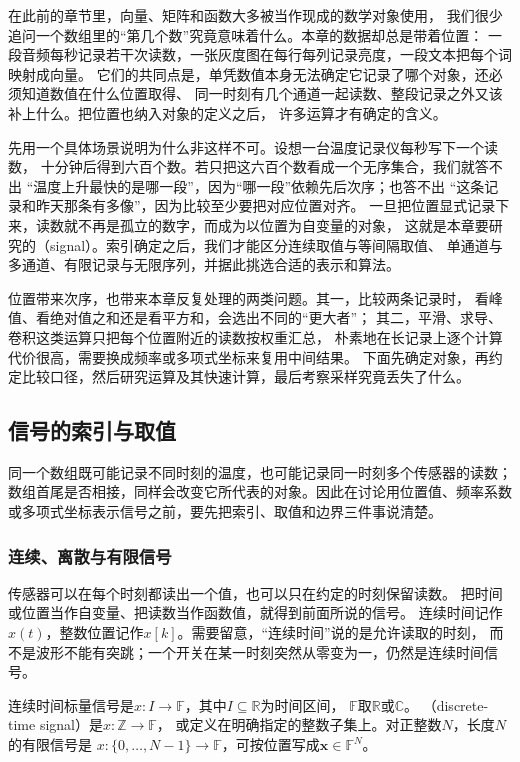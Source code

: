 在此前的章节里，向量、矩阵和函数大多被当作现成的数学对象使用，
我们很少追问一个数组里的“第几个数”究竟意味着什么。本章的数据却总是带着位置：
一段音频每秒记录若干次读数，一张灰度图在每行每列记录亮度，一段文本把每个词映射成向量。
它们的共同点是，单凭数值本身无法确定它记录了哪个对象，还必须知道数值在什么位置取得、
同一时刻有几个通道一起读数、整段记录之外又该补上什么。把位置也纳入对象的定义之后，
许多运算才有确定的含义。

先用一个具体场景说明为什么非这样不可。设想一台温度记录仪每秒写下一个读数，
十分钟后得到六百个数。若只把这六百个数看成一个无序集合，我们就答不出
“温度上升最快的是哪一段”，因为“哪一段”依赖先后次序；也答不出
“这条记录和昨天那条有多像”，因为比较至少要把对应位置对齐。
一旦把位置显式记录下来，读数就不再是孤立的数字，而成为以位置为自变量的对象，
这就是本章要研究的（signal）。索引确定之后，我们才能区分连续取值与等间隔取值、
单通道与多通道、有限记录与无限序列，并据此挑选合适的表示和算法。

位置带来次序，也带来本章反复处理的两类问题。其一，比较两条记录时，
看峰值、看绝对值之和还是看平方和，会选出不同的“更大者”；
其二，平滑、求导、卷积这类运算只把每个位置附近的读数按权重汇总，
朴素地在长记录上逐个计算代价很高，需要换成频率或多项式坐标来复用中间结果。
下面先确定对象，再约定比较口径，然后研究运算及其快速计算，最后考察采样究竟丢失了什么。

\subsection{信号的索引与取值}

同一个数组既可能记录不同时刻的温度，也可能记录同一时刻多个传感器的读数；
数组首尾是否相接，同样会改变它所代表的对象。因此在讨论用位置值、频率系数
或多项式坐标表示信号之前，要先把索引、取值和边界三件事说清楚。

\subsubsection{连续、离散与有限信号}

传感器可以在每个时刻都读出一个值，也可以只在约定的时刻保留读数。
把时间或位置当作自变量、把读数当作函数值，就得到前面所说的信号。
连续时间记作$x(t)$，整数位置记作$x[k]$。需要留意，“连续时间”说的是允许读取的时刻，
而不是波形不能有突跳；一个开关在某一时刻突然从零变为一，仍然是连续时间信号。

\begin{definition}[信号的索引类型]
  \label{def:signal-index-types}
  连续时间标量信号是$x:I\to\mathbb F$，其中$I\subseteq\mathbb R$为时间区间，
  $\mathbb F$取$\mathbb R$或$\mathbb C$。
  （discrete-time signal）是$x:\mathbb Z\to\mathbb F$，
  或定义在明确指定的整数子集上。对正整数$N$，长度$N$的有限信号是
  $x:\{0,\ldots,N-1\}\to\mathbb F$，可按位置写成$\bm x\in\mathbb F^N$。
\end{definition}

